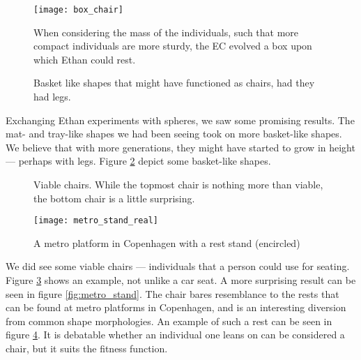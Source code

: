 \begin{figure}[ht]
	\centering
	\texttt{[image: box\_chair]}
	\caption{When considering the mass of the individuals, such that more
	compact individuals are more sturdy, the EC evolved a box upon which
	Ethan could rest.}
	\label{fig:boxchair}
\end{figure}

\begin{figure}[ht]
	\centering
	 \hfil
	\caption{Basket like shapes that might have functioned as chairs, had
	they had legs.}
	\label{fig:baskets}
\end{figure}

Exchanging Ethan experiments with spheres, we saw some promising results. The 
mat- and tray-like shapes we had been seeing took on more basket-like shapes. 
We believe that with more generations, they might have started to grow in 
height --- perhaps with legs. Figure \ref{fig:baskets} depict some basket-like 
shapes.

\begin{figure}[ht]
	\centering
	 \hfil
	\caption{Viable chairs. While the topmost chair is nothing more than
	viable, the bottom chair is a little surprising.}
	\label{fig:viable_chairs}
\end{figure}

\begin{figure}[ht]
	\centering
	\texttt{[image: metro\_stand\_real]}
	\caption{A metro platform in Copenhagen with a rest stand (encircled)}
	\label{fig:metro_stand_real}
\end{figure}

We did see some viable chairs --- individuals that a person could use for seating.
Figure \ref{fig:viable_chairs} shows an example, not unlike a car seat. A more
surprising result can be seen in figure \ref{fig:metro_stand}. The chair bares
resemblance to the rests that can be found at metro platforms in Copenhagen, and
is an interesting diversion from common shape morphologies. An example of such 
a rest can be seen in figure \ref{fig:metro_stand_real}. It is debatable 
whether an individual one leans on can be considered a chair, but it suits the 
fitness function.

